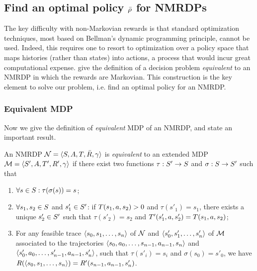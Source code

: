 \subsection{Find an optimal policy $\bar{\rho}$ for NMRDPs}\label{nmrdp-find-optimal-policy}
The  key  difficulty  with  non-Markovian  rewards  is  that
standard optimization techniques, most based on Bellman's \citep{Bellman:1957} 
dynamic  programming  principle,  cannot  be  used. Indeed, this requires one 
to resort to optimization over a policy space that maps histories
(rather than states)  into actions, a process that would incur great 
computational expense. \citep{bacchus1996rewarding} give the definition of 
a decision  problem \emph{equivalent} to an NMRDP  in  which  the  rewards  are
Markovian. This construction is the key element to solve our problem,
i.e. find an optimal policy for an NMRDP.


\subsubsection{Equivalent MDP}
Now we give the definition of \emph{equivalent} MDP of an NMRDP, and state an important result. 

\begin{definition}
	\label{nmrdp-mdp-equivalence}
	An NMRDP $\mathcal{N} = \langle S, A, T, \bar{R}, \gamma \rangle$ is \emph{equivalent} to an extended
	MDP $\mathcal{M} = \langle S', A, T', R', \gamma \rangle$ if there exist two functions 
	$\tau: S' \to S$ and $\sigma: S\to S'$ such that
	\begin{enumerate}
		\item $\forall s \in S: \tau (\sigma(s)) = s$; \label{nmrdp-mdp-equivalence-cond1}
		\item $\forall s_1, s_2 \in S$ and $s_1' \in S'$: if $T(s_1 , a, s_2 ) > 0$ and $\tau (s'_1) =
		s_1$, there exists a unique $s'_2 \in S'$ such that $\tau (s'_2 ) = s_2$ and
		$T'(s'_1 , a, s'_2 ) = T(s_1, a, s_2 )$;
		\label{nmrdp-mdp-equivalence-cond2}
		\item For any feasible trace $\langle s_0, s_1, \dots, s_n \rangle$ of $\mathcal{N}$
		and $\langle s'_0, s'_1, \dots, s'_n \rangle$ of $\mathcal{M}$ associated to the trajectories $\langle s_0, a_0, \dots, s_{n-1}, a_{n-1}, s_n \rangle$ and $\langle s'_0, a_0, \dots, s'_{n-1}, a_{n-1}, s'_n \rangle$, such that $\tau(s'_i) = s_i$
		and $\sigma(s_0) = s'_0$, we have $R(\langle s_0, s_1, \dots, s_n \rangle) =
		R'(s_{n-1}, a_{n-1}, s'_n)$.
		\label{nmrdp-mdp-equivalence-cond3}	
	\end{enumerate}
\end{definition}

